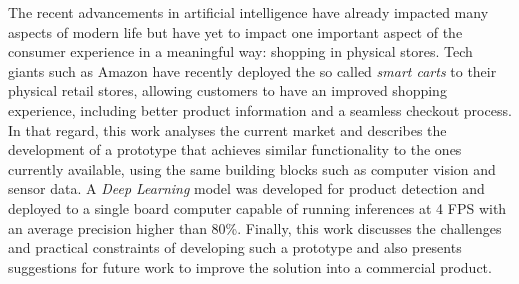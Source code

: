 
\begin{resumoutfpr}%
The recent advancements in artificial intelligence have already impacted many
aspects of modern life but have yet to impact one important aspect of the
consumer experience in a meaningful way: shopping in physical stores. Tech
giants such as Amazon have recently deployed the so called \textit{smart
carts} to their physical retail stores, allowing customers to have an
improved shopping experience, including better product information and a
seamless checkout process. In that regard, this work analyses the current
market and describes the development of a prototype that achieves similar
functionality to the ones currently available, using the same building
blocks such as computer vision and sensor data. A \textit{Deep Learning}
model was developed for product detection and deployed to a single board
computer capable of running inferences at 4 FPS with an average precision 
higher than  80\%. Finally, this work discusses the challenges and
practical constraints of developing such a prototype and also presents 
suggestions for future work to improve the solution into a commercial 
product.
\end{resumoutfpr}
